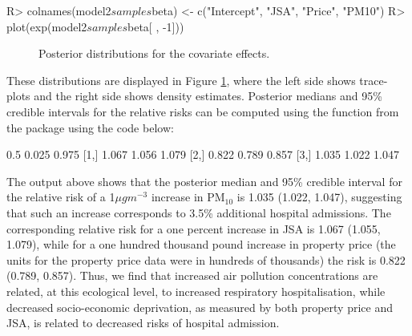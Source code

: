 \documentclass[article, nojss]{jss}
\begin{document}
\begin{CodeInput}
R>  colnames(model2$samples$beta) <- c("Intercept", "JSA", "Price", "PM10")
R>  plot(exp(model2$samples$beta[ , -1]))
\end{CodeInput}


\begin{figure}
\centering 
{}
\caption{Posterior distributions for the covariate effects.\label{pollution_mcmc}}
\end{figure} 

These distributions are displayed in Figure \ref{pollution_mcmc}, where the left side shows trace-plots and the right side shows density estimates. Posterior medians and 95\% credible intervals for the relative risks can be computed using the  function from the  package using the code below:



\begin{CodeOutput}
       0.5 0.025 0.975
[1,] 1.067 1.056 1.079
[2,] 0.822 0.789 0.857
[3,] 1.035 1.022 1.047
\end{CodeOutput}


The output above shows that the posterior median and 95\% credible interval for the relative risk of a 1$\mu gm^{-3}$  increase in PM$_{10}$ is 1.035 (1.022, 1.047), suggesting that such an increase corresponds to 3.5\% additional hospital admissions. The corresponding relative risk for a one percent increase in JSA is 1.067 (1.055, 1.079), while for a one hundred thousand pound increase in  property price (the units for the  property price data were in hundreds of thousands) the risk is 0.822 (0.789, 0.857). Thus, we find that increased air pollution concentrations are related, at this ecological level, to increased respiratory hospitalisation, while decreased socio-economic deprivation, as measured by both property price and JSA, is related to decreased risks of hospital admission.
\end{document}
